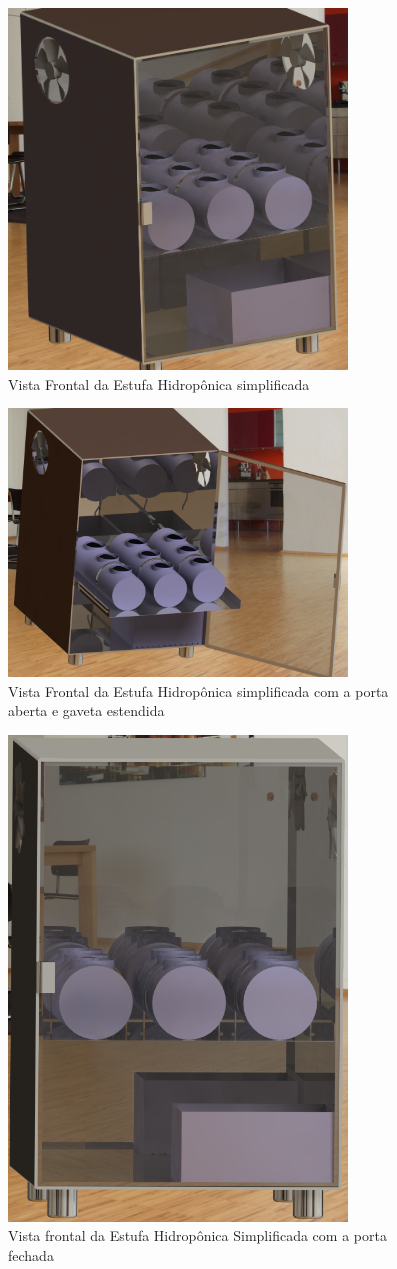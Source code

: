 \begin{figure}[H]
	\centering
	\includegraphics[width=9cm]{figuras/catia_9.png}
	\caption{Vista Frontal da Estufa Hidropônica simplificada} 
	\label{catia_9}
\end{figure}

\begin{figure}[H]
	\centering
	\includegraphics[width=9cm]{figuras/catia_10.png}
	\caption{Vista Frontal da Estufa Hidropônica simplificada com a porta aberta  e gaveta estendida} 
	\label{catia_10}
\end{figure}

\begin{figure}[H]
	\centering
	\includegraphics[width=9cm]{figuras/catia_11.png}
	\caption{Vista frontal da Estufa Hidropônica Simplificada com a porta fechada } 
	\label{catia_11}
\end{figure}
